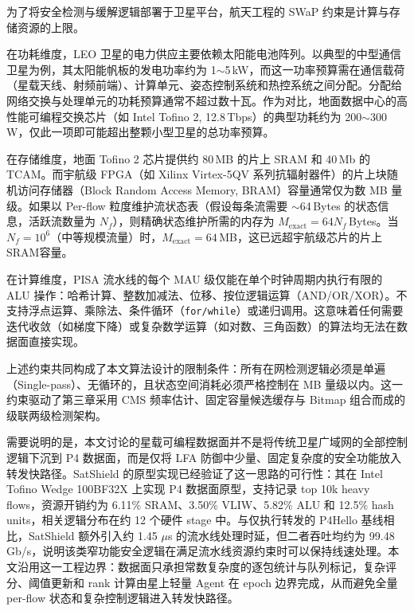 为了将安全检测与缓解逻辑部署于卫星平台，航天工程的 SWaP 约束是计算与存储资源的上限。

在功耗维度，LEO 卫星的电力供应主要依赖太阳能电池阵列。以典型的中型通信卫星为例，其太阳能帆板的发电功率约为 1$\sim$5\,kW，而这一功率预算需在通信载荷（星载天线、射频前端）、计算单元、姿态控制系统和热控系统之间分配。分配给网络交换与处理单元的功耗预算通常不超过数十瓦。作为对比，地面数据中心的高性能可编程交换芯片（如 Intel Tofino 2, 12.8\,Tbps）的典型功耗约为 200$\sim$300\,W，仅此一项即可能超出整颗小型卫星的总功率预算。

在存储维度，地面 Tofino 2 芯片提供约 80\,MB 的片上 SRAM 和 40\,Mb 的 TCAM。而宇航级 FPGA（如 Xilinx Virtex-5QV 系列抗辐射器件）的片上块随机访问存储器（Block Random Access Memory, BRAM）容量通常仅为数 MB 量级。如果以 Per-flow 粒度维护流状态表（假设每条流需要 $\sim$64\,Bytes 的状态信息，活跃流数量为 $N_f$），则精确状态维护所需的内存为 $M_{\text{exact}} = 64 N_f$\,Bytes。当 $N_f = 10^6$（中等规模流量）时，$M_{\text{exact}} = 64$\,MB，这已远超宇航级芯片的片上SRAM容量。

在计算维度，PISA 流水线的每个 MAU 级仅能在单个时钟周期内执行有限的 ALU 操作：哈希计算、整数加减法、位移、按位逻辑运算（AND/OR/XOR）。不支持浮点运算、乘除法、条件循环（\texttt{for/while}）或递归调用。这意味着任何需要迭代收敛（如梯度下降）或复杂数学运算（如对数、三角函数）的算法均无法在数据面直接实现。

上述约束共同构成了本文算法设计的限制条件：所有在网检测逻辑必须是单遍（Single-pass）、无循环的，且状态空间消耗必须严格控制在 MB 量级以内。这一约束驱动了第三章采用 CMS 频率估计、固定容量候选缓存与 Bitmap 组合而成的级联两级检测架构。

需要说明的是，本文讨论的星载可编程数据面并不是将传统卫星广域网的全部控制逻辑下沉到 P4 数据面，而是仅将 LFA 防御中少量、固定复杂度的安全功能放入转发快路径。SatShield 的原型实现已经验证了这一思路的可行性：其在 Intel Tofino Wedge 100BF32X 上实现 P4 数据面原型，支持记录 top 10k heavy flows，资源开销约为 6.11\% SRAM、3.50\% VLIW、5.82\% ALU 和 12.5\% hash units，相关逻辑分布在约 12 个硬件 stage 中。与仅执行转发的 P4Hello 基线相比，SatShield 额外引入约 1.45 $\mu$s 的流水线处理时延，但二者吞吐均约为 99.48 Gb/s，说明该类窄功能安全逻辑在满足流水线资源约束时可以保持线速处理。本文沿用这一工程边界：数据面只承担常数复杂度的逐包统计与队列标记，复杂评分、阈值更新和 rank 计算由星上轻量 Agent 在 epoch 边界完成，从而避免全量 per-flow 状态和复杂控制逻辑进入转发快路径。


